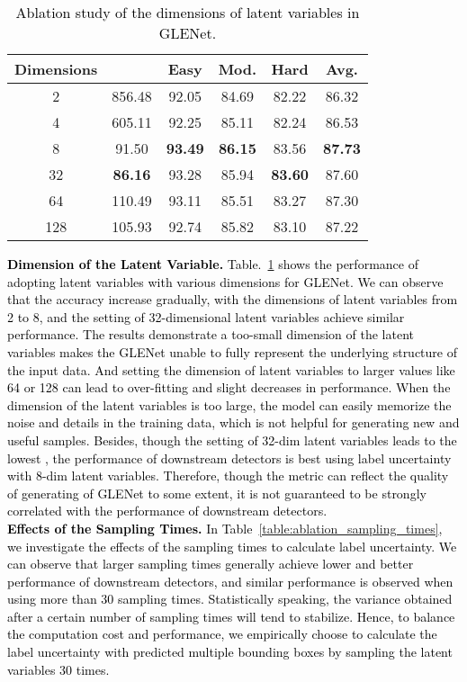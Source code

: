 \documentclass[twocolumn]{svjour3}
\newcommand{\revise}[1]{\textcolor{black}{#1}}
\begin{document}
\setlength{\tabcolsep}{7pt}
\begin{table}
	\centering
	\caption{\revise{Ablation study of the dimensions of latent variables in GLENet.}}
	\label{table:ablation_dim}
	\begin{tabular}{c|c|cccc} 
		\toprule
		Dimensions &  & Easy  & Mod.  & Hard  & Avg.   \\ 
		\hline
		2          & 856.48 & 92.05 & 84.69 & 82.22 & 86.32  \\
		4          & 605.11 & 92.25 & 85.11 & 82.24 & 86.53  \\
		8          & 91.50  & \textbf{93.49} & \textbf{86.15} & 83.56 & \textbf{87.73}  \\
		32         & \textbf{86.16}  & 93.28 & 85.94 & \textbf{83.60} & 87.60  \\
		64         & 110.49 & 93.11 & 85.51 & 83.27 & 87.30  \\
		128        & 105.93 & 92.74 & 85.82 & 83.10 & 87.22  \\
		\bottomrule
	\end{tabular}
\end{table}
\setlength{\tabcolsep}{1.5pt}

\noindent
\revise{
	\textbf{Dimension of the Latent Variable.} Table.~\ref{table:ablation_dim} shows the performance of adopting latent variables with various dimensions for GLENet. We can observe that the accuracy increase gradually, with the dimensions of latent variables from 2 to 8, and the setting of 32-dimensional latent variables achieve similar performance. The results demonstrate a too-small dimension of the latent variables makes the GLENet unable to fully represent the underlying structure of the input data. 
    And setting the dimension of latent variables to larger values like 64 or 128 can lead to over-fitting and slight decreases in performance. When the dimension of the latent variables is too large, the model can easily memorize the noise and details in the training data, which is not helpful for generating new and useful samples.
    Besides, though the setting of 32-dim latent variables leads to the lowest , the performance of downstream detectors is best using label uncertainty with 8-dim latent variables. Therefore, though the  metric can reflect the quality of generating of GLENet to some extent, it is not guaranteed to be strongly correlated with the performance of downstream detectors.
}\\

\noindent
\revise{
	\textbf{Effects of the Sampling Times.} In Table~\ref{table:ablation_sampling_times}, we investigate the effects of the sampling times to calculate label uncertainty. We can observe that larger sampling times generally achieve lower  and better performance of downstream detectors, and similar performance is observed when using more than 30 sampling times. Statistically speaking, the variance obtained after a certain number of sampling times will tend to stabilize.
	Hence, to balance the computation cost and performance, we empirically choose to calculate the label uncertainty with predicted multiple bounding boxes by sampling the latent variables 30 times.
}
\end{document}
